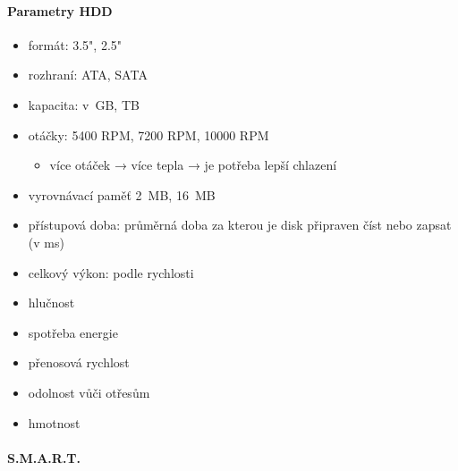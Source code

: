 \documentclass[a4paper,12pt]{article}
\providecommand{\tightlist}{%
\setlength{\itemsep}{0pt}\setlength{\parskip}{0pt}}
\begin{document}
\paragraph{Parametry HDD}

\begin{itemize}
\tightlist
\item formát: 3.5", 2.5"
\item rozhraní: ATA, SATA
\item kapacita: v~GB, TB
\item otáčky: 5400 RPM, 7200 RPM, 10000 RPM

  \begin{itemize}
  \tightlist
  \item více otáček → více tepla → je potřeba lepší chlazení
  \end{itemize}
\item vyrovnávací paměť 2~MB, 16~MB
\item přístupová doba: průměrná doba za kterou je disk připraven číst nebo
  zapsat (v ms)
\item celkový výkon: podle rychlosti
\item hlučnost
\item spotřeba energie
\item přenosová rychlost
\item odolnost vůči otřesům
\item hmotnost
\end{itemize}

\paragraph{S.M.A.R.T.}
\end{document}
